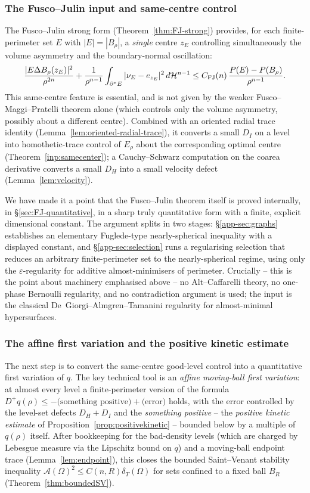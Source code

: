 \documentclass[11pt]{amsart}
\theoremstyle{definition}
\newcommand{\Om}{\Omega}
\newcommand{\Fr}{\mathcal A}
\newcommand{\dT}{\delta_T}
\newcommand{\eps}{\varepsilon}
\newcommand{\Hn}{\mathcal H^{n-1}}
\newcommand{\Per}{P}
\begin{document}
\subsubsection*{The Fusco--Julin input and same-centre control}

The Fusco--Julin strong form (Theorem~\ref{thm:FJ-strong}) provides,
for each finite-perimeter set \(E\) with \(|E|=|B_\rho|\), a
\emph{single} centre \(z_E\) controlling simultaneously the volume
asymmetry and the boundary-normal oscillation:
\[
   \frac{|E\Delta B_\rho(z_E)|^2}{\rho^{2n}}
   +
   \frac1{\rho^{n-1}}\int_{\partial^*E}|\nu_E-e_{z_E}|^2\,d\Hn
   \le
   C_{\rm FJ}(n)\,\frac{\Per(E)-\Per(B_\rho)}{\rho^{n-1}}.
\]
This same-centre feature is essential, and is not given by the weaker
Fusco--Maggi--Pratelli theorem alone (which controls only the volume
asymmetry, possibly about a different centre).  Combined with an oriented
radial trace identity (Lemma~\ref{lem:oriented-radial-trace}), it
converts a small \(D_I\) on a level into homothetic-trace control of
\(E_\rho\) about the corresponding optimal centre
(Theorem~\ref{inp:samecenter}); a Cauchy--Schwarz computation on the
coarea derivative converts a small \(D_H\) into a small velocity defect
(Lemma~\ref{lem:velocity}).

We have made it a point that the Fusco--Julin theorem itself is proved
internally, in \S\ref{sec:FJ-quantitative}, in a sharp truly quantitative
form with a finite, explicit dimensional constant.  The argument splits
in two stages: \S\ref{app-sec:graphs} establishes an elementary
Fuglede-type nearly-spherical inequality with a displayed constant, and
\S\ref{app-sec:selection} runs a regularising selection that reduces an
arbitrary finite-perimeter set to the nearly-spherical regime, using
only the \(\eps\)-regularity for additive almost-minimisers of
perimeter.  Crucially -- this is the point about machinery emphasised
above -- no Alt--Caffarelli theory, no one-phase Bernoulli regularity,
and no contradiction argument is used; the input is the classical
De~Giorgi--Almgren--Tamanini regularity for almost-minimal hypersurfaces.

\subsubsection*{The affine first variation and the positive kinetic estimate}

The next step is to convert the same-centre good-level control into a
quantitative first variation of \(q\).  The key technical tool is an
\emph{affine moving-ball first variation}: at almost every level a
finite-perimeter version of the formula
\(D^+q(\rho)\le -\text{(something positive)}+\text{(error)}\) holds, with
the error controlled by the level-set defects \(D_H+D_I\) and the
\emph{something positive} -- the \emph{positive kinetic estimate} of
Proposition~\ref{prop:positivekinetic} -- bounded below by a multiple of
\(q(\rho)\) itself.  After bookkeeping for the bad-density levels (which
are charged by Lebesgue measure via the Lipschitz bound on \(q\)) and a
moving-ball endpoint trace (Lemma~\ref{lem:endpoint}), this closes the
bounded Saint--Venant stability inequality
\(\Fr(\Om)^2\le C(n,R)\dT(\Om)\) for sets confined to a fixed ball
\(B_R\) (Theorem~\ref{thm:boundedSV}).
\end{document}
